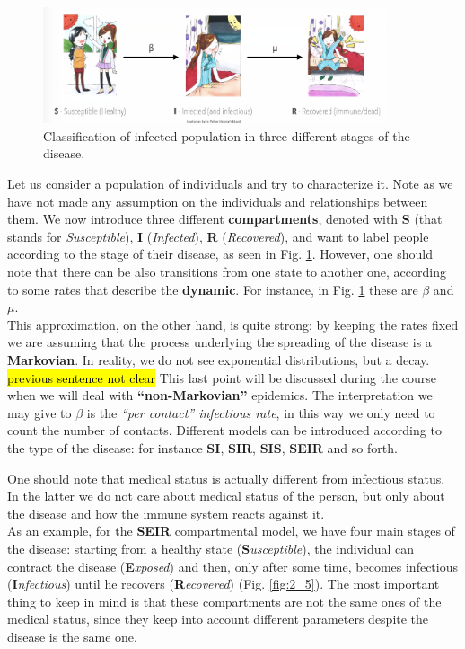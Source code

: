 \documentclass[../main/main.tex]{subfiles}
\begin{document}
\begin{figure}[!b]
\centering
\includegraphics[width=0.9\textwidth]{../lessons/image/02/1_classification.png}
\caption{\label{fig:1_classification} Classification of infected population in three different stages of the disease.}
\end{figure}

Let us consider a population of individuals and try to characterize it. Note as we have not made any assumption on the individuals and relationships between them. We now introduce three different \textbf{compartments}, denoted with \textbf{S} (that stands for \textit{Susceptible}), \textbf{I} (\textit{Infected}), \textbf{R} (\textit{Recovered}), and want to label people according to the stage of their disease, as seen in Fig. \ref{fig:1_classification}. However, one should note that there can be also transitions from one state to another one, according to some rates that describe the \textbf{dynamic}. For instance, in Fig. \ref{fig:1_classification} these are $\beta$ and $\mu$.\\
This approximation, on the other hand, is quite strong: by keeping the rates fixed we are assuming that the process underlying the spreading of the disease is a \textbf{Markovian}. In reality, we do not see exponential distributions, but a decay. \hl{previous sentence not clear} This last point will be discussed during the course when we will deal with \textbf{“non-Markovian”} epidemics. The interpretation we may give to $\beta$ is the \textit{“per contact” infectious rate}, in this way we only need to count the number of contacts.
Different models can be introduced according to the type of the disease: for instance \textbf{SI}, \textbf{SIR}, \textbf{SIS}, \textbf{SEIR} and so forth.

\medskip

One should note that medical status is actually different from infectious status. In the latter we do not care about medical status of the person, but only about the disease and how the immune system reacts against it.\\
As an example, for the \textbf{SEIR} compartmental model, we have four main stages of the disease: starting from a healthy state (\textbf{S}\textit{usceptible}), the individual can contract the disease (\textbf{E}\textit{xposed}) and then, only after some time, becomes infectious (\textbf{I}\textit{nfectious}) until he recovers (\textbf{R}\textit{ecovered}) (Fig. \ref{fig:2_5}). The most important thing to keep in mind is that these compartments are not the same ones of the medical status, since they keep into account different parameters despite the disease is the same one.
\end{document}
